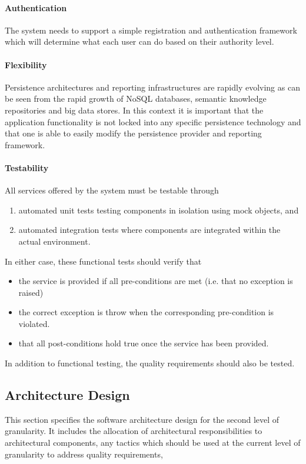 \paragraph*{Authentication}
The system needs to support a simple registration and authentication framework
which will determine what each user can do based on their authority level.

\paragraph*{Flexibility}
Persistence architectures and reporting infrastructures are rapidly evolving as can
be seen from the rapid growth of NoSQL databases, semantic knowledge repositories and big data
stores. In this context it is important that the application functionality is not locked into any
specific persistence technology and that one is able to easily modify the persistence provider and
reporting framework.

\paragraph*{Testability}
All services offered by the system must be testable through
\begin{enumerate}
	\item automated unit tests testing components in isolation using mock objects, and
	\item automated integration tests where components are integrated within the actual environment.
\end{enumerate}

In either case, these functional tests should verify that
\begin{itemize}
	\item the service is provided if all pre-conditions are met (i.e. that no exception is raised)
	\item the correct exception is throw when the corresponding pre-condition
	is violated.
	\item that all post-conditions hold true once the service has been provided.
\end{itemize}

In addition to functional testing, the quality requirements should also be tested.

\subsection{Architecture Design}
This section specifies the software architecture design for the second level of 
granularity. It includes the allocation of architectural responsibilities to 
architectural components, any tactics which should be used at the current level
of granularity to address quality requirements,

